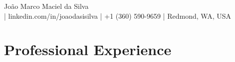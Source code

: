 \documentclass[letterpaper,11pt]{article}
\begin{document}
\begin{center}
{\Large João Marco Maciel da Silva}\\[5pt]
{\footnotesize \EMAIL{} | linkedin.com/in/joaodasisilva | +1 (360) 590-9659 | Redmond, WA, USA}\\[5pt]
\end{center}


\section{Professional Experience}










\end{document}
